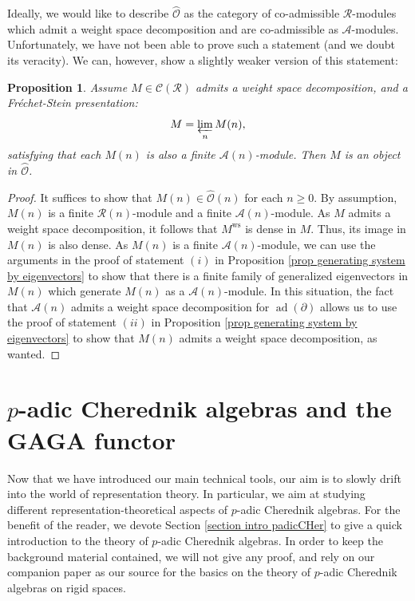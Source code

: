 \documentclass{amsart}
\newtheorem{prop}[defi]{ Proposition}
\newcommand{\OX}{\mathcal{O}}
\begin{document}
Ideally, we would like to describe $\wideparen{\OX}$ as the category of co-admissible $\mathscr{R}$-modules which admit a weight space decomposition and are co-admissible as $\mathscr{A}$-modules. Unfortunately, we have not been able to prove such a statement (and we doubt its veracity). We can, however, show a slightly weaker version of this statement:
\begin{prop}
Assume $M\in \mathcal{C}(\mathscr{R})$ admits a weight space decomposition, and a Fréchet-Stein presentation:
\begin{equation*}
    M=\varprojlim_n M(n),
\end{equation*}
satisfying that each $M(n)$ is also a finite $\mathscr{A}(n)$-module. Then $M$ is an object in $\wideparen{\OX}$.
\end{prop}
\begin{proof}
It suffices to show that $M(n)\in \widehat{\OX}(n)$ for each $n\geq 0$. By assumption, $M(n)$ is a finite $\mathscr{R}(n)$-module and a finite $\mathscr{A}(n)$-module. As $M$ admits a weight space decomposition, it follows that $M^{\operatorname{ws}}$ is dense in $M$. Thus, its image in $M(n)$ is also dense. As $M(n)$ is a finite $\mathscr{A}(n)$-module,
we can use the arguments in the proof of statement $(i)$ in Proposition \ref{prop generating system by eigenvectors} to show that there is a finite family of generalized eigenvectors in $M(n)$ which generate $M(n)$ as a  $\mathscr{A}(n)$-module. In this situation, the fact that $\mathscr{A}(n)$ admits a weight space decomposition for $\operatorname{ad}(\partial)$ allows us to use the proof of statement $(ii)$ in Proposition \ref{prop generating system by eigenvectors} to show that $M(n)$ admits a weight space decomposition, as wanted.
\end{proof}
\section{\texorpdfstring{$p$-adic Cherednik algebras and the GAGA functor}{}}\label{Section GAGA for cherednik algebras}
Now that we have introduced our main technical tools, our aim is to slowly drift into the world of representation theory. In particular, we aim at studying different representation-theoretical aspects of $p$-adic Cherednik algebras. For the benefit of the reader, we devote Section \ref{section intro padicCHer} to give a quick introduction to the theory of $p$-adic Cherednik algebras. In order to keep the background material contained, we will not give any proof, and rely on our companion paper \cite{p-adicCheralg} as our source for the basics on the theory of $p$-adic Cherednik algebras on rigid spaces. 
\end{document}
